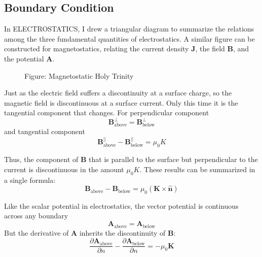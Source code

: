\documentclass[../../../main.tex]{subfiles}
\begin{document}
\subsection{Boundary Condition}
In ELECTROSTATICS, I drew a triangular diagram to summarize the relations among the three fundamental quantities of electrostatics. A similar figure can be constructed for magnetostatics, relating the current density \textbf{J}, the field \textbf{B}, and the potential \textbf{A}.

\begin{figure}[ht]
    \centering
    \caption*{Figure: Magnetostatic Holy Trinity}
\end{figure}

Just as the electric field suffers a discontinuity at a surface charge, so the magnetic field is discontinuous at a surface current. Only this time it is the tangential component that changes. For perpendicular component
\begin{equation*}
    \mathbf{B}_\text{above}^{\bot}=\mathbf{B}_\text{below}^{\bot}
\end{equation*}
and tangential component
\begin{equation*}
    \mathbf{B}_\text{above}^{||}-\mathbf{B}_\text{below}^{||}=\mu_0K
\end{equation*}

Thus, the component of $\mathbf{B}$ that is parallel to the surface but perpendicular to the current is discontinuous in the amount $\mu_0K$. These results can be summarized in a single formula:
\begin{equation*}
    \mathbf{B}_\text{above}-\mathbf{B}_\text{below}=\mu_0(\mathbf{K}\times\mathbf{\hat{n}})
\end{equation*}

Like the scalar potential in electrostatics, the vector potential is continuous
across any boundary
\begin{equation*}
    \mathbf{A}_\text{above}=\mathbf{A}_\text{below}
\end{equation*}
But the derivative of \textbf{A} inherits the discontinuity of \textbf{B}:
\begin{equation*}
    \frac{\partial \mathbf{A}_\text{above}}{ \partial n}-\frac{\partial \mathbf{A}_\text{below}}{\partial n}= -\mu_0\mathbf{K}
\end{equation*}
\end{document}
